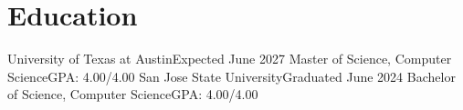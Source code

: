 \section{Education}
  \resumeSubHeadingListStart
    \resumeSubheading
      {University of Texas at Austin}{Expected June 2027}
      {Master of Science, Computer Science}{GPA: 4.00/4.00}
    \resumeSubheading
      {San Jose State University}{Graduated June 2024}
      {Bachelor of Science, Computer Science}{GPA: 4.00/4.00}
  \resumeSubHeadingListEnd